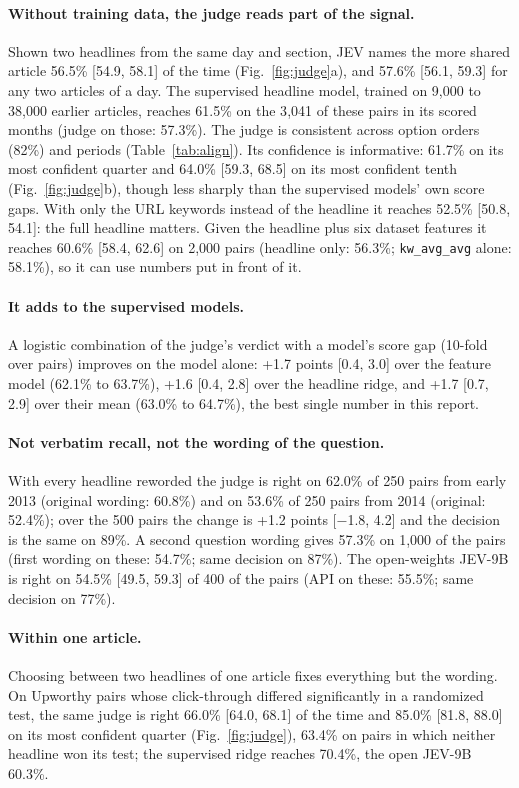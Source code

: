\documentclass[10pt,a4paper,twocolumn]{article}
\begin{document}
\paragraph{Without training data, the judge reads part of the signal.} Shown two headlines from the same day and
section, JEV names the more shared article 56.5\% [54.9, 58.1] of the time (Fig.~\ref{fig:judge}a), and 57.6\%
[56.1, 59.3] for any two articles of a day. The supervised headline model, trained on 9{,}000 to 38{,}000 earlier articles, reaches 61.5\% on the 3{,}041 of these pairs in its scored
months (judge on those: 57.3\%). The judge is consistent
across option orders (82\%) and periods (Table~\ref{tab:align}). Its confidence
is informative: 61.7\% on its most confident quarter and 64.0\% [59.3, 68.5] on its most confident tenth
(Fig.~\ref{fig:judge}b), though less sharply than the supervised models' own score gaps. With only
the URL keywords instead of the headline it reaches 52.5\% [50.8, 54.1]: the full headline matters. Given the
headline plus six dataset features it reaches 60.6\% [58.4, 62.6] on 2{,}000 pairs (headline only: 56.3\%;
\texttt{kw\_avg\_avg} alone: 58.1\%), so it can use numbers put in front of it.

\paragraph{It adds to the supervised models.} A logistic combination of the judge's verdict with a model's score
gap (10-fold over pairs) improves on the model alone: +1.7 points [0.4, 3.0] over the feature model (62.1\% to
63.7\%), +1.6 [0.4, 2.8] over the headline ridge, and +1.7 [0.7, 2.9] over their mean (63.0\% to 64.7\%), the
best single number in this report.

\paragraph{Not verbatim recall, not the wording of the question.} With every headline reworded the judge is right on
62.0\% of 250 pairs from early 2013 (original wording: 60.8\%) and on 53.6\% of 250 pairs from 2014 (original:
52.4\%); over the 500 pairs the change is +1.2 points [$-$1.8, 4.2] and the decision is the same on 89\%. A
second question wording gives 57.3\% on 1{,}000 of the pairs (first wording on these: 54.7\%; same decision on 87\%). The open-weights JEV-9B is right on 54.5\% [49.5, 59.3] of 400 of the pairs (API on these: 55.5\%; same
decision on 77\%).

\paragraph{Within one article.} Choosing between two headlines of one article fixes everything but the wording.
On Upworthy pairs whose click-through differed significantly in a randomized test, the same judge is right 66.0\%
[64.0, 68.1] of the time and 85.0\% [81.8, 88.0] on its most confident quarter (Fig.~\ref{fig:judge}), 63.4\% on
pairs in which neither headline won its test; the supervised ridge reaches 70.4\%, the open JEV-9B 60.3\%.
\end{document}
